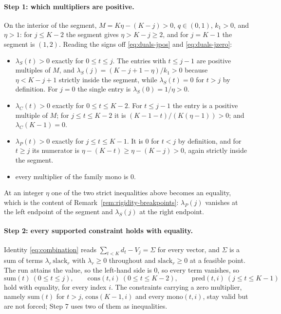 \paragraph{Step 1: which multipliers are positive.}
On the interior of the segment, $M=K\eta-(K-j)>0$, $q\in(0,1)$, $k_1>0$, and
$\eta>1$: for $j\le K-2$ the segment gives $\eta>K-j\ge2$, and for $j=K-1$ the
segment is $(1,2)$.  Reading the signs off \eqref{eq:duals-jpos} and
\eqref{eq:duals-jzero}:
\begin{itemize}
\item $\lambda_S(t)>0$ exactly for $0\le t\le j$.  The entries with
$t\le j-1$ are positive multiples of $M$, and
$\lambda_S(j)=(K-j+1-\eta)/k_1>0$ because $\eta<K-j+1$ strictly inside the
segment, while $\lambda_S(t)=0$ for $t>j$ by definition.  For $j=0$ the single
entry is $\lambda_S(0)=1/\eta>0$.
\item $\lambda_C(t)>0$ exactly for $0\le t\le K-2$.  For $t\le j-1$ the entry
is a positive multiple of $M$; for $j\le t\le K-2$ it is
$(K-1-t)/(K(\eta-1))>0$; and $\lambda_C(K-1)=0$.
\item $\lambda_P(t)>0$ exactly for $j\le t\le K-1$.  It is $0$ for $t<j$ by
definition, and for $t\ge j$ its numerator is
$\eta-(K-t)\ge\eta-(K-j)>0$, again strictly inside the segment.
\item every multiplier of the family $\mathrm{mono}$ is $0$.
\end{itemize}
At an integer $\eta$ one of the two strict inequalities above becomes an
equality, which is the content of
Remark~\ref{rem:rigidity-breakpoints}: $\lambda_P(j)$ vanishes at the left
endpoint of the segment and $\lambda_S(j)$ at the right endpoint.

\paragraph{Step 2: every supported constraint holds with equality.}
Identity \eqref{eq:combination} reads $\sum_{t<K}d_t-V_j=\Sigma$ for every
vector, and $\Sigma$ is a sum of terms $\lambda_r\,\mathrm{slack}_r$ with
$\lambda_r\ge0$ throughout and $\mathrm{slack}_r\ge0$ at a feasible point.
The run attains the value, so the left-hand side is $0$, so every term
vanishes, so
\[
  \mathrm{sum}(t)\ (0\le t\le j),\qquad
  \mathrm{cons}(t,i)\ (0\le t\le K-2),\qquad
  \mathrm{pred}(t,i)\ (j\le t\le K-1)
\]
hold with equality, for every index $i$.  The constraints carrying a zero
multiplier, namely $\mathrm{sum}(t)$ for $t>j$, $\mathrm{cons}(K-1,i)$ and
every $\mathrm{mono}(t,i)$, stay valid but are not forced; Step 7 uses two of
them as inequalities.

